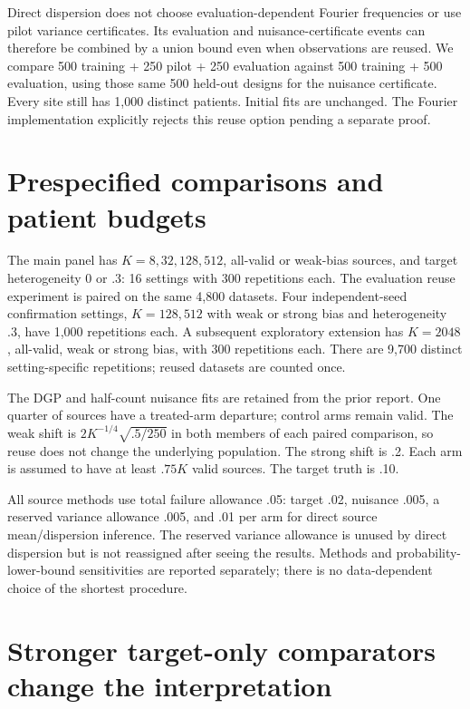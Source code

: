 \documentclass[11pt]{article}
\begin{document}
Direct dispersion does not choose evaluation-dependent Fourier frequencies
or use pilot variance certificates. Its evaluation and nuisance-certificate
events can therefore be combined by a union bound even when observations
are reused. We compare 500 training + 250 pilot + 250 evaluation against
500 training + 500 evaluation, using those same 500 held-out designs for the
nuisance certificate. Every site still has 1,000 distinct patients. Initial
fits are unchanged. The Fourier implementation explicitly rejects this reuse
option pending a separate proof.

\section{Prespecified comparisons and patient budgets}

The main panel has $K=8,32,128,512$, all-valid or weak-bias sources, and target
heterogeneity 0 or .3: 16 settings with 300 repetitions each. The evaluation
reuse experiment is paired on the same 4,800 datasets. Four independent-seed
confirmation settings, $K=128,512$ with weak or strong bias and heterogeneity
.3, have 1,000 repetitions each. A subsequent exploratory extension has
$K=2048$, all-valid, weak or strong bias, with 300 repetitions each. There are
9,700 distinct setting-specific repetitions; reused datasets are counted once.

The DGP and half-count nuisance fits are retained from the prior report.
One quarter of sources have a treated-arm departure; control arms remain
valid. The weak shift is
$2K^{-1/4}\sqrt{.5/250}$ in both members of each paired comparison, so reuse
does not change the underlying population. The strong shift is .2. Each arm
is assumed to have at least $.75K$ valid sources. The target truth is .10.

All source methods use total failure allowance .05: target .02, nuisance
.005, a reserved variance allowance .005, and .01 per arm for direct
source mean/dispersion inference. The reserved variance allowance is unused
by direct dispersion but is not reassigned after seeing the results.
Methods and probability-lower-bound sensitivities are reported separately;
there is no data-dependent choice of the shortest procedure.

\section{Stronger target-only comparators change the interpretation}
\end{document}

